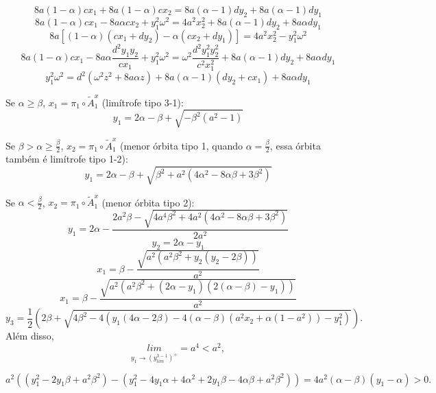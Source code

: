 \newpage
$$
8a(1- \alpha )cx_1 + 8a (1-\alpha) c x_2= 8a(\alpha-1)dy_2+8a (\alpha-1) d y_1
$$
$$
8a(1- \alpha )cx_1 -8a \alpha c x_2	+y_1^2\omega^2= 4a^2x_2^2 + 8a(\alpha-1)dy_2+8a \alpha d y_1
$$
$$
8a[(1- \alpha )(cx_1+dy_2) -\alpha (c x_2+ d y_1)]= 4a^2x_2^2 -y_1^2\omega^2
$$
$$
8a(1- \alpha )cx_1 -8a \alpha  \frac{d^2y_1y_2}{c x_1}	+y_1^2\omega^2= \omega^2\frac{d^2y_1^2y_2^2}{c^2x_1^2} + 8a(\alpha-1)dy_2+8a \alpha d y_1
$$
$$
y_1^2\omega^2= d^2(\omega^2z^2+8a \alpha  z)+ 8a(\alpha-1)(dy_2+cx_1)+8a \alpha d y_1
$$

Se $\alpha\geq\beta$, $x_1=\pi_1\circ\tilde{A}^x_1$ (limítrofe tipo 3-1):
$$y_1=2\alpha-\beta+\sqrt{-\beta^2(a^2-1)}$$

Se $\beta>\alpha\geq\frac{\beta}{2}$, $x_2=\pi_1\circ\tilde{A}^x_1$ (menor órbita tipo 1, quando $\alpha=\frac{\beta}{2}$, essa órbita também é limítrofe tipo 1-2):
$$
y_1=2\alpha-\beta + \sqrt{\beta^2 + a^2 (4 \alpha^2 - 8 \alpha \beta + 3 \beta^2)}
$$

Se $\alpha<\frac{\beta}{2}$, $x_2=\pi_1\circ\tilde{A}^x_1$ (menor órbita tipo 2):
$$
y_1 = 2\alpha -\frac{2 a^2 \beta - \sqrt{4 a^4 \beta^2 + 4 a^2 (4 \alpha^2 - 8 \alpha \beta + 3 \beta^2)}}{2 a^2}
$$
$$
y_2=2\alpha-y_1
$$
$$
x_1=\beta-\frac{\sqrt{ a^2( a^2\beta^2 +  y_2 (y_2 - 2 \beta))}}{ a^2}
$$
$$
x_1=\beta-\frac{\sqrt{ a^2( a^2\beta^2 +  (2\alpha-y_1) (2(\alpha-\beta)-y_1 ))}}{ a^2}
$$
$$
y_3=\frac{1}{2}\left(2 \beta + \sqrt{4 \beta^2 - 4 (y_1(4 \alpha - 2 \beta)-4 (\alpha - \beta) (a^2x_2 + \alpha(1-a^2)) - y_1^2 )}\right).
$$
Além disso, 
$$\underset{y_1\rightarrow (y_{lim}^{3-1})^+}{lim}=a^4<a^2,$$

$$
a^2((y_1^2 - 2 y_1 \beta + a^2 \beta^2)-(y_1^2 - 4 y_1 \alpha + 4 \alpha^2 + 2 y_1 \beta - 4 \alpha \beta + a^2 \beta^2))=4a^2(\alpha- \beta) (y_1-\alpha)>0.
$$
